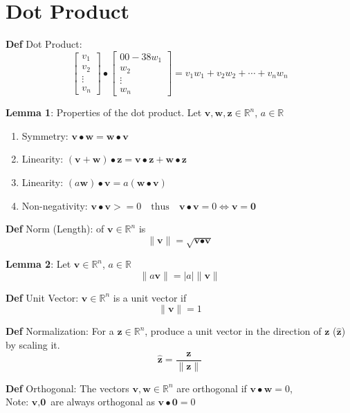 \documentclass[11pt,notitlepage]{report}
\newcommand{\tbf}[1]{\textbf{#1}}
\begin{document}
\section{Dot Product}

\textbf{Def} Dot Product: $$
\begin{bmatrix}
v_1\\v_2\\ \vdots\\ v_n
\end{bmatrix} 
\bullet  
\begin{bmatrix} 0 0 -3 8
w_1\\w_2\\ \vdots\\ w_n
\end{bmatrix}
= v_1w_1 + v_2w_2 + \cdots + v_nw_n$$


\textbf{Lemma 1}: Properties of the dot product. Let $\tbf v, \tbf w, \tbf z \in \mathbb R^n$, $a \in \mathbb R$
\begin{enumerate}[label=(\roman*)]
    \item Symmetry: $\tbf v \bullet \tbf w = \tbf w \bullet \tbf v$
    \item Linearity: $(\tbf v + \tbf w) \bullet \tbf z = \tbf v \bullet \tbf z + \tbf w \bullet \tbf z$
    \item Linearity: $(a\tbf w) \bullet \tbf v = a(\tbf w \bullet \tbf v)$
    \item Non-negativity: $\tbf v \bullet \tbf v >= 0 \quad \text{thus} \quad \tbf v \bullet \tbf v = 0 \Longleftrightarrow \tbf v = \tbf 0$
\end{enumerate}


\textbf{Def} Norm (Length): of $\tbf v \in \mathbb R^n$ is 
$$\lVert \tbf v \rVert = \sqrt{\tbf v \bullet \tbf v}$$


\textbf{Lemma 2}: Let $\tbf v \in \mathbb R^n$, $a \in \mathbb R$
$$\lVert a\tbf v \rVert = |a| \lVert \tbf v \rVert$$


\textbf{Def} Unit Vector: $\tbf v \in \mathbb R^n$ is a unit vector if 
$$\lVert \tbf v \rVert = 1$$


\textbf{Def} Normalization: For a $\tbf z \in \mathbb R^n$, produce a unit vector in the direction of $\tbf z$ ($\hat{\tbf z}$) by scaling it.
$$\hat{\tbf z} = \frac{\tbf z}{\lVert \tbf z \rVert}$$


\textbf{Def} Orthogonal: The vectors $\tbf v, \tbf w \in \mathbb R^n$ are orthogonal if $\tbf v \bullet \tbf w = 0$,\\
\hspace*{5mm} Note: $\tbf v, \tbf 0$ are always orthogonal as $\tbf v \bullet \tbf 0 = 0$
\end{document}
